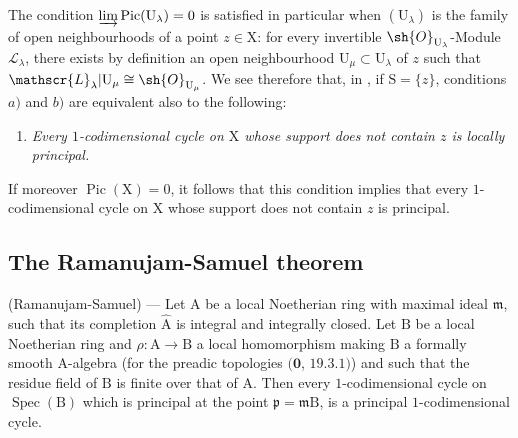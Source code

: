 \begin{remark}[21.13.16]
The condition $\varinjlim\operatorname{Pic}(\mathrm{U}_\lambda)=0$ is satisfied in particular when $(\mathrm{U}_\lambda)$ is the family of open neighbourhoods of a point $z\in\mathrm{X}$: for every invertible $\sh{O}_{\mathrm{U}_\lambda}$-Module $\mathscr{L}_\lambda$, there exists by definition an open neighbourhood $\mathrm{U}_\mu\subset\mathrm{U}_\lambda$ of $z$ such that $\mathscr{L}_\lambda|\mathrm{U}_\mu\cong\sh{O}_{\mathrm{U}_\mu}$.
We see therefore that, in , if $\mathrm{S}=\{z\}$, conditions $a)$ and $b)$ are equivalent also to the following:
\begin{enumerate}
  \item[c)] \emph{Every $1$-codimensional cycle on $\mathrm{X}$ whose support does not contain $z$ is locally principal.}
\end{enumerate}

If moreover $\operatorname{Pic}(\mathrm{X})=0$, it follows that this condition implies that every $1$-codimensional cycle on $\mathrm{X}$ whose support does not contain $z$ is principal.
\end{remark}

\subsection{The Ramanujam-Samuel theorem}
\label{subsection:IV.21.14}

\begin{theorem}[21.14.1]
\label{IV.21.14.1}
\textup{(Ramanujam-Samuel)} ---
Let $\mathrm{A}$ be a local Noetherian ring with maximal ideal $\mathfrak{m}$, such that its completion $\widehat{\mathrm{A}}$ is integral and integrally closed.
Let $\mathrm{B}$ be a local Noetherian ring and $\rho:\mathrm{A}\to\mathrm{B}$ a local homomorphism making $\mathrm{B}$ a formally smooth $\mathrm{A}$-algebra (for the preadic topologies $(\mathbf{0}$, $19.3.1)$) and such that the residue field of $\mathrm{B}$ is finite over that of $\mathrm{A}$.
Then every $1$-codimensional cycle on $\operatorname{Spec}(\mathrm{B})$ which is principal at the point $\mathfrak{p}=\mathfrak{m}\mathrm{B}$, is a principal $1$-codimensional cycle.
\end{theorem}

